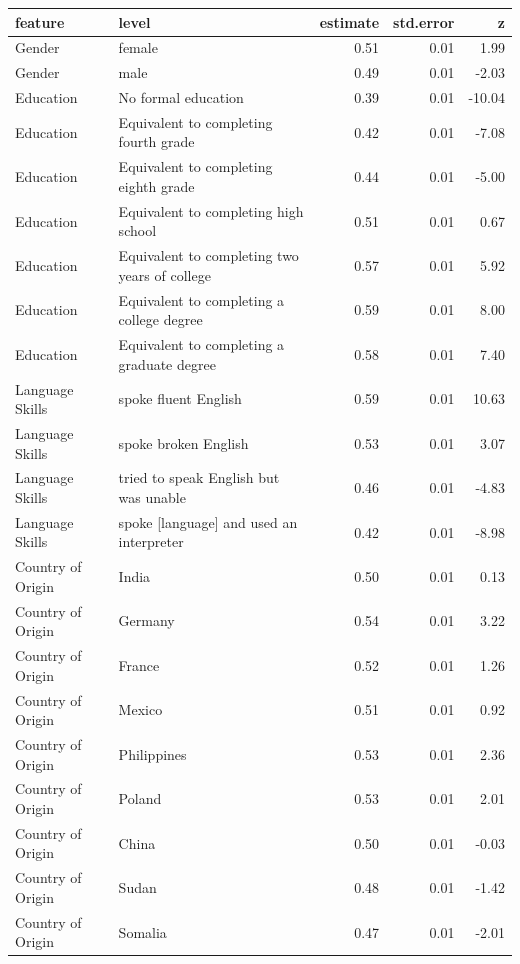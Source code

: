 \documentclass[a4paper,12pt]{article}\usepackage[]{graphicx}\usepackage[]{color}
\begin{document}
\begin{table}[ht]
\centering
\begingroup\footnotesize
\begin{tabular}{lp{3in}rrr}
  \hline
feature & level & estimate & std.error & z \\ 
  \hline
Gender & female & 0.51 & 0.01 & 1.99 \\ 
  Gender & male & 0.49 & 0.01 & -2.03 \\ 
  Education & No formal education & 0.39 & 0.01 & -10.04 \\ 
  Education & Equivalent to completing fourth grade & 0.42 & 0.01 & -7.08 \\ 
  Education & Equivalent to completing eighth grade & 0.44 & 0.01 & -5.00 \\ 
  Education & Equivalent to completing high school & 0.51 & 0.01 & 0.67 \\ 
  Education & Equivalent to completing two years of college & 0.57 & 0.01 & 5.92 \\ 
  Education & Equivalent to completing a college degree & 0.59 & 0.01 & 8.00 \\ 
  Education & Equivalent to completing a graduate degree & 0.58 & 0.01 & 7.40 \\ 
  Language Skills & spoke fluent English & 0.59 & 0.01 & 10.63 \\ 
  Language Skills & spoke broken English & 0.53 & 0.01 & 3.07 \\ 
  Language Skills & tried to speak English but was unable & 0.46 & 0.01 & -4.83 \\ 
  Language Skills & spoke [language] and used an interpreter & 0.42 & 0.01 & -8.98 \\ 
  Country of Origin & India & 0.50 & 0.01 & 0.13 \\ 
  Country of Origin & Germany & 0.54 & 0.01 & 3.22 \\ 
  Country of Origin & France & 0.52 & 0.01 & 1.26 \\ 
  Country of Origin & Mexico & 0.51 & 0.01 & 0.92 \\ 
  Country of Origin & Philippines & 0.53 & 0.01 & 2.36 \\ 
  Country of Origin & Poland & 0.53 & 0.01 & 2.01 \\ 
  Country of Origin & China & 0.50 & 0.01 & -0.03 \\ 
  Country of Origin & Sudan & 0.48 & 0.01 & -1.42 \\ 
  Country of Origin & Somalia & 0.47 & 0.01 & -2.01 \\ 

\end{tabular}
\end{table}
\end{document}
